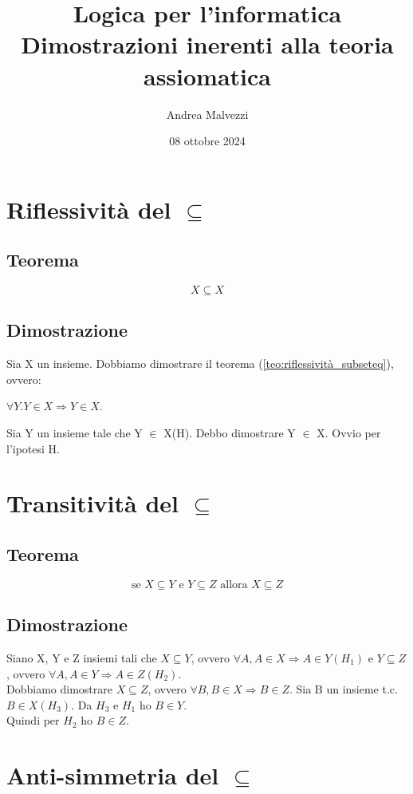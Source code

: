 \documentclass[12pt]{article}
\title{\textbf{Logica per l'informatica\\Dimostrazioni inerenti alla teoria assiomatica}}
\date{08 ottobre 2024}
\author{Andrea Malvezzi}
\begin{document}
\maketitle
\pagebreak
\tableofcontents
\pagebreak
\section{Riflessività del $\subseteq$}
\subsection{Teorema}
\begin{equation}
    X \subseteq X \label{teo:riflessività_subseteq}
\end{equation}
\subsection{Dimostrazione}
Sia X un insieme. Dobbiamo dimostrare il teorema (\ref{teo:riflessività_subseteq}), ovvero:
\begin{center}
    $\forall Y.Y \in X \Rightarrow Y \in X$.
\end{center}
Sia Y un insieme tale che Y $\in$ X(H). Debbo dimostrare Y $\in$ X. Ovvio per l'ipotesi H.
\section{Transitività del $\subseteq$}
\subsection{Teorema}
\begin{equation}
    \text{se } X \subseteq Y \text{ e } Y \subseteq Z \text{ allora } X \subseteq Z \label{teo:transitività_subseteq}
\end{equation}
\subsection{Dimostrazione}
Siano X, Y e Z insiemi tali che $X \subseteq Y$, ovvero $\forall A, A \in X \Rightarrow A \in Y (H_1)$ e $Y \subseteq Z$, ovvero $\forall A, A \in Y \Rightarrow A \in Z (H_2)$.\\
Dobbiamo dimostrare $X \subseteq Z$, ovvero $\forall B, B \in X \Rightarrow B \in Z$. Sia B un insieme t.c. $B \in X (H_3)$. Da $H_3$ e $H_1$ ho $B \in Y$. \\
Quindi per $H_2$ ho $B \in Z$.
\pagebreak
\section{Anti-simmetria del $\subseteq$}
\end{document}
